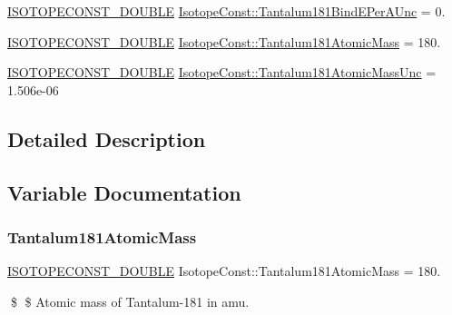 \begin{DoxyCompactItemize}
\mbox{\hyperlink{group___isotope_const-_macros_ga8f45a7272ce02c0b4c65c44636ed719a}{I\+S\+O\+T\+O\+P\+E\+C\+O\+N\+S\+T\+\_\+\+D\+O\+U\+B\+LE}} \mbox{\hyperlink{group___isotope_const-_tantalum-_ta181_ga7d1df80a72110531c29a756619328311}{Isotope\+Const\+::\+Tantalum181\+Bind\+E\+Per\+A\+Unc}} = 0.
\item 
\mbox{\hyperlink{group___isotope_const-_macros_ga8f45a7272ce02c0b4c65c44636ed719a}{I\+S\+O\+T\+O\+P\+E\+C\+O\+N\+S\+T\+\_\+\+D\+O\+U\+B\+LE}} \mbox{\hyperlink{group___isotope_const-_tantalum-_ta181_ga696230d8e6dd107cd1d7b3162de9cec5}{Isotope\+Const\+::\+Tantalum181\+Atomic\+Mass}} = 180.
\item 
\mbox{\hyperlink{group___isotope_const-_macros_ga8f45a7272ce02c0b4c65c44636ed719a}{I\+S\+O\+T\+O\+P\+E\+C\+O\+N\+S\+T\+\_\+\+D\+O\+U\+B\+LE}} \mbox{\hyperlink{group___isotope_const-_tantalum-_ta181_ga26ad315e2e0154b1c5cb0a0630fcd470}{Isotope\+Const\+::\+Tantalum181\+Atomic\+Mass\+Unc}} = 1.\+506e-\/06
\end{DoxyCompactItemize}


\subsection{Detailed Description}


\subsection{Variable Documentation}
\mbox{\label{group___isotope_const-_tantalum-_ta181_ga696230d8e6dd107cd1d7b3162de9cec5}} 
\subsubsection{\texorpdfstring{Tantalum181\+Atomic\+Mass}{Tantalum181AtomicMass}}
{\footnotesize\ttfamily \mbox{\hyperlink{group___isotope_const-_macros_ga8f45a7272ce02c0b4c65c44636ed719a}{I\+S\+O\+T\+O\+P\+E\+C\+O\+N\+S\+T\+\_\+\+D\+O\+U\+B\+LE}} Isotope\+Const\+::\+Tantalum181\+Atomic\+Mass = 180.}

\$ \$ Atomic mass of Tantalum-\/181 in amu. \mbox{\label{group___isotope_const-_tantalum-_ta181_ga26ad315e2e0154b1c5cb0a0630fcd470}} 
